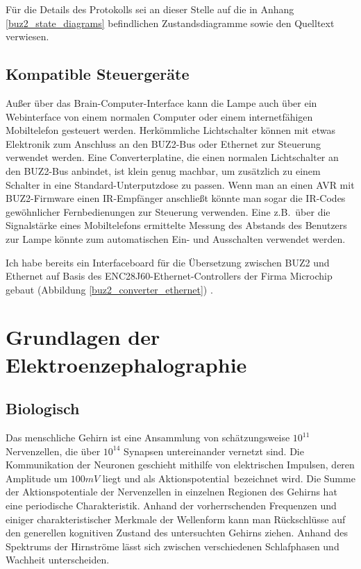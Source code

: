 \documentclass[12pt,a4paper,notitlepage]{article}
\begin{document}
Für die Details des Protokolls sei an dieser Stelle auf die in Anhang \ref{buz2_state_diagrams} befindlichen Zustandsdiagramme sowie den Quelltext verwiesen.


\subsection{Kompatible Steuergeräte}
Außer über das Brain-Computer-Interface kann die Lampe auch über ein Webinterface von einem normalen Computer oder einem internetfähigen Mobiltelefon gesteuert werden. Herkömmliche Lichtschalter können mit etwas Elektronik zum Anschluss an den BUZ2-Bus oder Ethernet zur Steuerung verwendet werden. Eine Converterplatine, die einen normalen Lichtschalter an den BUZ2-Bus anbindet, ist klein genug machbar, um zusätzlich zu einem Schalter in eine Standard-Unterputzdose zu passen. Wenn man an einen AVR mit BUZ2-Firmware einen IR-Empfänger anschließt könnte man sogar die IR-Codes gewöhnlicher Fernbedienungen zur Steuerung verwenden. Eine z.B.\ über die Signalstärke eines Mobiltelefons ermittelte Messung des Abstands des Benutzers zur Lampe könnte zum automatischen Ein- und Ausschalten verwendet werden.

Ich habe bereits ein Interfaceboard für die Übersetzung zwischen BUZ2 und Ethernet auf Basis des ENC28J60-Ethernet-Controllers der Firma Microchip gebaut (Abbildung \ref{buz2_converter_ethernet}) \cite{MICROCHIP1}.
\section{Grundlagen der Elektroenzephalographie}
\subsection{Biologisch}
Das menschliche Gehirn ist eine Ansammlung von schätzungsweise $10^{11}$ Nervenzellen, die über $10^{14}$ Synapsen untereinander vernetzt sind. Die Kommunikation der Neuronen geschieht mithilfe von elektrischen Impulsen, deren Amplitude um $100mV$ liegt und als \glqq Aktionspotential\grqq\ bezeichnet wird. Die Summe der Aktionspotentiale der Nervenzellen in einzelnen Regionen des Gehirns hat eine periodische Charakteristik. Anhand der vorherrschenden Frequenzen und einiger charakteristischer Merkmale der Wellenform kann man Rückschlüsse auf den generellen kognitiven Zustand des untersuchten Gehirns ziehen. Anhand des Spektrums der Hirnströme lässt sich zwischen verschiedenen Schlafphasen und Wachheit unterscheiden\cite{WP14,WP15,WP16,WP17,WP18,WP19}.
\end{document}
